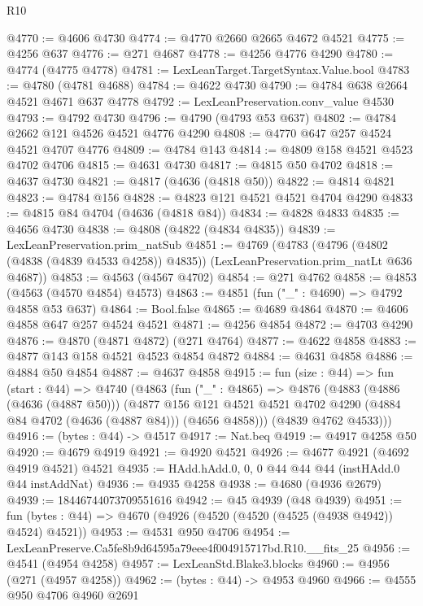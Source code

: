\begin{lexlean}{R10}
\begin{coremodule}
@4770 := @4606 @4730
@4774 := @4770 @2660 @2665 @4672 @4521
@4775 := @4256 @637
@4776 := @271 @4687
@4778 := @4256 @4776 @4290
@4780 := @4774 (@4775 @4778)
@4781 := LexLeanTarget.TargetSyntax.Value.bool
@4783 := @4780 (@4781 @4688)
@4784 := @4622 @4730
@4790 := @4784 @638 @2664 @4521 @4671 @637 @4778
@4792 := LexLeanPreservation.conv_value @4530
@4793 := @4792 @4730
@4796 := @4790 (@4793 @53 @637)
@4802 := @4784 @2662 @121 @4526 @4521 @4776 @4290
@4808 := @4770 @647 @257 @4524 @4521 @4707 @4776
@4809 := @4784 @143
@4814 := @4809 @158 @4521 @4523 @4702 @4706
@4815 := @4631 @4730
@4817 := @4815 @50 @4702
@4818 := @4637 @4730
@4821 := @4817 (@4636 (@4818 @50))
@4822 := @4814 @4821
@4823 := @4784 @156
@4828 := @4823 @121 @4521 @4521 @4704 @4290
@4833 := @4815 @84 @4704 (@4636 (@4818 @84))
@4834 := @4828 @4833
@4835 := @4656 @4730
@4838 := @4808 (@4822 (@4834 @4835))
@4839 := LexLeanPreservation.prim_natSub
@4851 := @4769
    (@4783
      (@4796 (@4802 (@4838 (@4839 @4533 @4258)) @4835))
      (LexLeanPreservation.prim_natLt @636 @4687))
@4853 := @4563 (@4567 @4702)
@4854 := @271 @4762
@4858 := @4853 (@4563 (@4570 @4854) @4573)
@4863 := @4851 (fun ("_" : @4690) => @4792 @4858 @53 @637)
@4864 := Bool.false
@4865 := @4689 @4864
@4870 := @4606 @4858 @647 @257 @4524 @4521
@4871 := @4256 @4854
@4872 := @4703 @4290
@4876 := @4870 (@4871 @4872) (@271 @4764)
@4877 := @4622 @4858
@4883 := @4877 @143 @158 @4521 @4523 @4854 @4872
@4884 := @4631 @4858
@4886 := @4884 @50 @4854
@4887 := @4637 @4858
@4915 := fun (size : @44) =>
  fun (start : @44) =>
  @4740
    (@4863
      (fun ("_" : @4865) =>
      @4876
        (@4883
          (@4886 (@4636 (@4887 @50)))
          (@4877
            @156
            @121
            @4521
            @4521
            @4702
            @4290
            (@4884 @84 @4702 (@4636 (@4887 @84)))
            (@4656 @4858)))
        (@4839 @4762 @4533)))
@4916 := (bytes : @44) -> @4517
@4917 := Nat.beq
@4919 := @4917 @4258 @50
@4920 := @4679 @4919
@4921 := @4920 @4521
@4926 := @4677 @4921 (@4692 @4919 @4521) @4521
@4935 := HAdd.hAdd.{0, 0, 0} @44 @44 @44 (instHAdd.{0} @44 instAddNat)
@4936 := @4935 @4258
@4938 := @4680 (@4936 @2679)
@4939 := 18446744073709551616
@4942 := @45 @4939 (@48 @4939)
@4951 := fun (bytes : @44) => @4670 (@4926 (@4520 (@4520 (@4525 (@4938 @4942)) @4524) @4521))
@4953 := @4531 @950 @4706
@4954 := LexLeanPreserve.Ca5fe8b9d64595a79eee4f004915717bd.R10.__fits_25
@4956 := @4541 (@4954 @4258)
@4957 := LexLeanStd.Blake3.blocks
@4960 := @4956 (@271 (@4957 @4258))
@4962 := (bytes : @44) -> @4953 @4960
@4966 := @4555 @950 @4706 @4960 @2691

\end{coremodule}
\end{lexlean}
